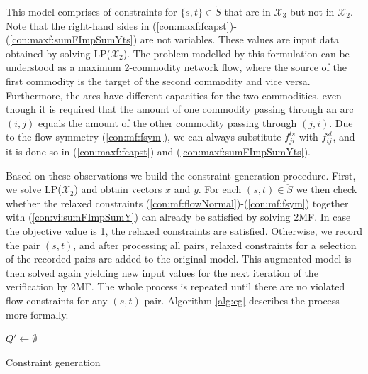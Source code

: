 This model comprises of constraints for $\{s,t\}\in\check{S}$ that are in $\mathcal{X}_3$ but not in $\mathcal{X}_2$.
Note that the right-hand sides in (\ref{con:maxf:fcapst})-(\ref{con:maxf:sumFImpSumYts}) are not variables.
These values are input data obtained by solving LP($\mathcal{X}_2$).
The problem modelled by this formulation can be understood as a maximum 2-commodity network flow, where the source of the first commodity is the target of the second commodity and vice versa.
Furthermore, the arcs have different capacities for the two commodities, even though it is required that the amount of one commodity passing through an arc $(i,j)$ equals the amount of the other commodity passing through $(j,i)$.
Due to the flow symmetry (\ref{con:mf:fsym}), we can always substitute $f^{ts}_{ji}$ with $f^{st}_{ij}$, and it is done so in (\ref{con:maxf:fcapst}) and (\ref{con:maxf:sumFImpSumYts}).
 
Based on these observations we build the constraint generation procedure.
First, we solve LP($\mathcal{X}_2$) and obtain vectors $x$ and $y$.
For each $(s,t)\in \check{S}$ we then check whether the relaxed constraints (\ref{con:mf:flowNormal})-(\ref{con:mf:fsym}) together with (\ref{con:vi:sumFImpSumY}) can already be satisfied by solving 2MF.
In case the objective value is 1, the relaxed constraints are satisfied.
Otherwise, we record the pair $(s,t)$, and after processing all pairs, relaxed constraints for a selection of the recorded pairs are added to the original model.
This augmented model is then solved again yielding new input values for the next iteration of the verification by 2MF.
The whole process is repeated until there are no violated flow constraints for any $(s,t)$ pair.
Algorithm \ref{alg:cg} describes the process more formally.

\begin{algorithm}
$Q'\leftarrow\emptyset$
 ~\newline
 \caption{Constraint generation}
\label{alg:cg}
\end{algorithm}

